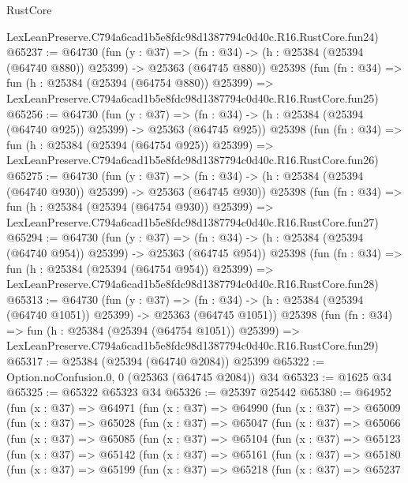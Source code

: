 \begin{lexlean}{RustCore}
\begin{coremodule}
    LexLeanPreserve.C794a6cad1b5e8fdc98d1387794c0d40c.R16.RustCore.fun24)
@65237 := @64730
    (fun (y : @37) =>
    (fn : @34) -> (h : @25384 (@25394 (@64740 @880)) @25399) -> @25363 (@64745 @880))
    @25398
    (fun (fn : @34) =>
    fun (h : @25384 (@25394 (@64754 @880)) @25399) =>
    LexLeanPreserve.C794a6cad1b5e8fdc98d1387794c0d40c.R16.RustCore.fun25)
@65256 := @64730
    (fun (y : @37) =>
    (fn : @34) -> (h : @25384 (@25394 (@64740 @925)) @25399) -> @25363 (@64745 @925))
    @25398
    (fun (fn : @34) =>
    fun (h : @25384 (@25394 (@64754 @925)) @25399) =>
    LexLeanPreserve.C794a6cad1b5e8fdc98d1387794c0d40c.R16.RustCore.fun26)
@65275 := @64730
    (fun (y : @37) =>
    (fn : @34) -> (h : @25384 (@25394 (@64740 @930)) @25399) -> @25363 (@64745 @930))
    @25398
    (fun (fn : @34) =>
    fun (h : @25384 (@25394 (@64754 @930)) @25399) =>
    LexLeanPreserve.C794a6cad1b5e8fdc98d1387794c0d40c.R16.RustCore.fun27)
@65294 := @64730
    (fun (y : @37) =>
    (fn : @34) -> (h : @25384 (@25394 (@64740 @954)) @25399) -> @25363 (@64745 @954))
    @25398
    (fun (fn : @34) =>
    fun (h : @25384 (@25394 (@64754 @954)) @25399) =>
    LexLeanPreserve.C794a6cad1b5e8fdc98d1387794c0d40c.R16.RustCore.fun28)
@65313 := @64730
    (fun (y : @37) =>
    (fn : @34) -> (h : @25384 (@25394 (@64740 @1051)) @25399) -> @25363 (@64745 @1051))
    @25398
    (fun (fn : @34) =>
    fun (h : @25384 (@25394 (@64754 @1051)) @25399) =>
    LexLeanPreserve.C794a6cad1b5e8fdc98d1387794c0d40c.R16.RustCore.fun29)
@65317 := @25384 (@25394 (@64740 @2084)) @25399
@65322 := Option.noConfusion.{0, 0} (@25363 (@64745 @2084)) @34
@65323 := @1625 @34
@65325 := @65322 @65323 @34
@65326 := @25397 @25442
@65380 := @64952
    (fun (x : @37) =>
    @64971
      (fun (x : @37) =>
      @64990
        (fun (x : @37) =>
        @65009
          (fun (x : @37) =>
          @65028
            (fun (x : @37) =>
            @65047
              (fun (x : @37) =>
              @65066
                (fun (x : @37) =>
                @65085
                  (fun (x : @37) =>
                  @65104
                    (fun (x : @37) =>
                    @65123
                      (fun (x : @37) =>
                      @65142
                        (fun (x : @37) =>
                        @65161
                          (fun (x : @37) =>
                          @65180
                            (fun (x : @37) =>
                            @65199
                              (fun (x : @37) =>
                              @65218
                                (fun (x : @37) =>
                                @65237

\end{coremodule}
\end{lexlean}
